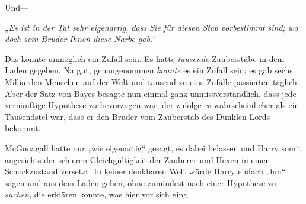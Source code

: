 Und—

„\emph{Es ist in der Tat sehr eigenartig, dass Sie für diesen Stab vorbestimmt sind; wo doch sein Bruder Ihnen diese Narbe gab.}“

Das konnte unmöglich ein Zufall sein. Es hatte \emph{tausende} Zauberstäbe in dem Laden gegeben. Na gut, genaugenommen \emph{konnte} es ein Zufall sein; es gab sechs Milliarden Menschen auf der Welt und tausend-zu-eins-Zufälle passierten täglich. Aber der Satz von Bayes besagte nun einmal ganz unmissverständlich, dass jede vernünftige Hypothese zu bevorzugen war, der zufolge es wahrscheinlicher als ein Tausendstel war, dass er den Bruder vom Zauberstab des Dunklen Lords bekommt.

McGonagall hatte nur „wie eigenartig“ gesagt, es dabei belassen und Harry somit angesichts der schieren Gleichgültigkeit der Zauberer und Hexen in einen Schockzustand versetzt. In keiner denkbaren Welt würde Harry einfach „hm“ sagen und aus dem Laden gehen, ohne zumindest nach einer Hypothese zu \emph{suchen}, die erklären konnte, was hier vor sich ging.

